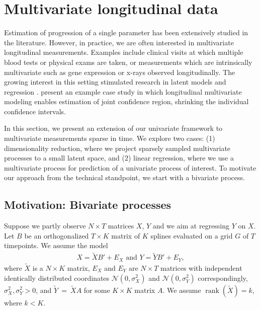 \documentclass[preprint]{imsart}
\numberwithin{equation}{section}
\theoremstyle{plain}
\newcommand{\cN}{\mathcal{N}}
\DeclareMathOperator*{\rank}{rank}
\begin{document}
\section{Multivariate longitudinal data}\label{s:multivariate}

Estimation of progression of a single parameter has been extensively studied in the literature. However, in practice, we are often interested in multivariate longitudinal measurements. Examples include clinical visits at which multiple blood tests or physical exams are taken, or measurements which are intrinsically multivariate such as gene expression or x-rays observed longitudinally. The growing interest in this setting stimulated research in latent models \citep{sammel1996latent} and regression \citep{gray1998estimating,gray2000multidimensional}. \citet{diggle2002analysis} present an example case study in which longitudinal multivariate modeling enables estimation of joint confidence region, shrinking the individual confidence intervals.

In this section, we present an extension of our univariate framework to multivariate measurements sparse in time. %
We explore two cases: (1) dimensionality reduction, where we project sparsely sampled multivariate processes to a small latent space, and (2) linear regression, where we use a multivariate process for prediction of a univariate process of interest. To motivate our approach from the technical standpoint, we start with a bivariate process.


\subsection{Motivation: Bivariate processes}

Suppose we partly observe $N\times T$ matrices $X$, $Y$ and we aim at regressing $Y$ on $X$. Let $B$ be an orthogonalized $T\times K$ matrix of $K$ splines evaluated on a grid $G$ of $T$ timepoints. We assume the model \begin{align*}
X = \tilde{X}B' + E_X \text{ \ and \ } Y = \tilde{Y}B' + E_{Y},
\end{align*}
where $\tilde{X}$ is a $N\times K$ matrix, $E_X$ and $E_Y$ are $N \times T$ matrices with independent identically distributed coordinates $\cN(0,\sigma_X^2)$ and $\cN(0,\sigma_Y^2)$ correspondingly, $\sigma_X^2,\sigma_Y^2 > 0$, and $\tilde{Y}~=~\tilde{X}A$ for some $K\times K$ matrix $A$. We assume $\rank(\tilde{X}) = k$, where $k < K$.
\end{document}
